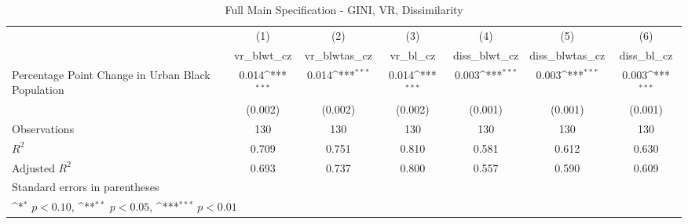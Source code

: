 \begin{table}[htbp]\centering
\def\sym#1{\ifmmode^{#1}\else\(^{#1}\)\fi}
\caption{Full Main Specification - GINI, VR, Dissimilarity}
\begin{tabular}{l*{6}{c}}
\hline\hline
                    &\multicolumn{1}{c}{(1)}&\multicolumn{1}{c}{(2)}&\multicolumn{1}{c}{(3)}&\multicolumn{1}{c}{(4)}&\multicolumn{1}{c}{(5)}&\multicolumn{1}{c}{(6)}\\
                    &\multicolumn{1}{c}{vr\_blwt\_cz}&\multicolumn{1}{c}{vr\_blwtas\_cz}&\multicolumn{1}{c}{vr\_bl\_cz}&\multicolumn{1}{c}{diss\_blwt\_cz}&\multicolumn{1}{c}{diss\_blwtas\_cz}&\multicolumn{1}{c}{diss\_bl\_cz}\\
\hline
Percentage Point Change in Urban Black Population&       0.014\sym{***}&       0.014\sym{***}&       0.014\sym{***}&       0.003\sym{***}&       0.003\sym{***}&       0.003\sym{***}\\
                    &     (0.002)         &     (0.002)         &     (0.002)         &     (0.001)         &     (0.001)         &     (0.001)         \\
\hline
Observations        &         130         &         130         &         130         &         130         &         130         &         130         \\
\(R^{2}\)           &       0.709         &       0.751         &       0.810         &       0.581         &       0.612         &       0.630         \\
Adjusted \(R^{2}\)  &       0.693         &       0.737         &       0.800         &       0.557         &       0.590         &       0.609         \\
\hline\hline
\multicolumn{7}{l}{\footnotesize Standard errors in parentheses}\\
\multicolumn{7}{l}{\footnotesize \sym{*} \(p<0.10\), \sym{**} \(p<0.05\), \sym{***} \(p<0.01\)}\\
\end{tabular}
\end{table}
